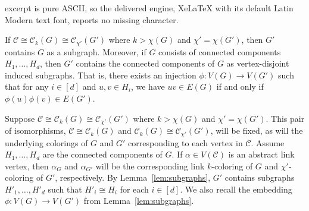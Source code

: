 \documentclass[10pt,a4paper]{amsart}
\newcommand{\C}{\mathcal C}
\begin{document}
excerpt is pure ASCII, so the delivered engine, XeLaTeX with its default Latin Modern text font, reports no missing character.
\begin{lemma}\label{lem:subgraphs}
    If $\C\cong \C_k(G)\cong \C_{\chi'}(G')$ where $k>\chi(G)$ and $\chi'=\chi(G')$, then $G'$ contains $G$ as a subgraph. Moreover, if $G$ consists of connected components $H_1,\dots,H_d$, then $G'$ contains the connected components of $G$ as vertex-disjoint induced subgraphs. That is, there exists an injection $\phi\colon V(G)\to V(G')$ such that for any $i\in[d]$ and $u,v\in H_i$, we have $uv\in E(G)$ if and only if $\phi(u)\phi(v)\in E(G')$. 
\end{lemma}

\begin{hypothesis}\label{hyp:running} Suppose $\C\cong \C_k(G)\cong \C_{\chi'}(G')$ where $k>\chi(G)$ and $\chi'=\chi(G')$. This pair of isomorphisms, $\C\cong \C_k(G)$ and $\C_k(G)\cong \C_{\chi'}(G')$, will be fixed, as will the underlying colorings of $G$ and $G'$ corresponding to each vertex in $\C$. Assume $H_1, \dots, H_d$ are the connected components of $G$. If $\alpha\in V(\C)$ is an abstract link vertex, then $\alpha_G$ and $\alpha_{G'}$ will be the corresponding link $k$-coloring of $G$ and $\chi'$-coloring of $G'$, respectively.  By Lemma~\ref{lem:subgraphs}, $G'$ contains subgraphs $H'_1, \dots, H'_d$ such that $H'_i\cong H_i$ for each $i\in [d]$. We also recall the embedding $\phi\colon V(G)\to V(G')$ from Lemma~\ref{lem:subgraphs}. 
\end{hypothesis}
\end{document}
